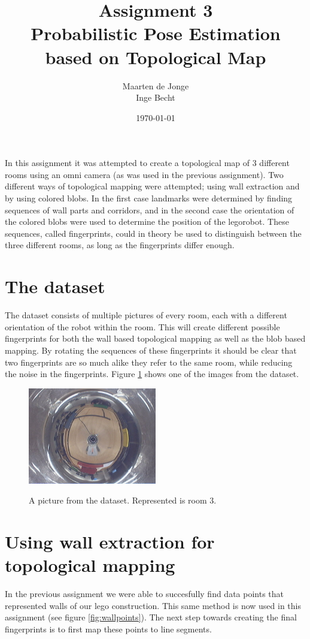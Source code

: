 \documentclass[a4paper, 20pt]{article}
\author{Maarten de Jonge \\
    Inge Becht}
\date{\today}
\title{Assignment 3\\ 
Probabilistic Pose Estimation based on Topological Map}
\begin{document}
\maketitle

In this assignment it was attempted to create a topological map of 3 different
rooms using an omni camera (as was used in the previous assignment). Two
different ways of topological mapping were attempted; using wall extraction
and by using colored blobs. In the first case landmarks were determined by
finding sequences of wall parts and corridors, and in the second case the
orientation of the colored blobs were used to determine the position of the
legorobot.
These sequences, called fingerprints, could in theory be used to distinguish between
the three different rooms, as long as the fingerprints differ enough.

\section{The dataset} 
The dataset consists of multiple pictures of every room, each with a different
orientation of the robot within the room. This will create different possible
fingerprints for both the wall based topological mapping as well as the blob
based mapping. By rotating the sequences of these fingerprints it should be
clear that two fingerprints are so much alike they refer to the same room, while
reducing the noise in the fingerprints. Figure \ref{fig:exdata} shows one of the
images from the dataset.

\begin{figure}[!ht]
\centering
  \includegraphics[width=0.5\textwidth]{data_set/2012-11-26-121531.jpg}
  \label{fig:exdata}
  \caption{A picture from the dataset. Represented is room 3.} 
\end{figure}

\section{Using wall extraction for topological mapping}
In the previous assignment we were able to succesfully find data points that
represented walls of our lego construction. This same method is now used in this
assignment (see figure \ref{fig:wallpoints}). The next step towards creating the 
final fingerprints is to first  map these points to line segments. 
\end{document}
